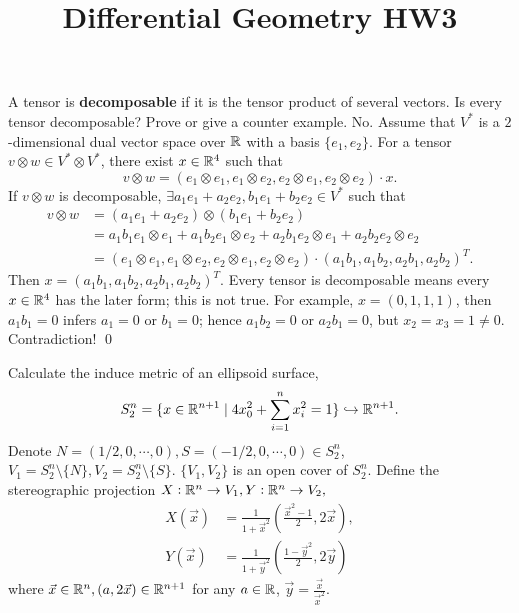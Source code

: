 

\title{Differential Geometry HW3}
\author{\asemail}
\maketitle

\begin{enumerate}
\isep[1em]

\prob A tensor is \textbf{decomposable} if it is the tensor product of several vectors. Is every tensor decomposable? Prove or give a counter example.
\soln
No. Assume that $V^*$ is a $2$-dimensional dual vector space over $\mathbb{R}$ with a basis $\{e_1,e_2\}$. 
For a tensor $v\otimes w\in V^*\otimes V^*$, there exist $x\in \mathbb{R}^4$ such that $$
v\otimes w=(e_1\otimes e_1, e_1\otimes e_2, e_2\otimes e_1, e_2\otimes e_2)\cdot x .$$
If $v\otimes w$ is decomposable, $\exists a_1 e_1+ a_2 e_2, b_1 e_1+ b_2 e_2\in V^*$ such that 
\begin{align*}
	v\otimes w &= (a_1 e_1+ a_2 e_2)\otimes (b_1 e_1+ b_2 e_2) \\
	&= a_1b_1 e_1\otimes e_1+a_1b_2 e_1\otimes e_2+a_2b_1 e_2\otimes e_1+a_2b_2 e_2\otimes e_2 \\
	&= (e_1\otimes e_1, e_1\otimes e_2, e_2\otimes e_1, e_2\otimes e_2)\cdot (a_1b_1, a_1b_2, a_2b_1, a_2b_2)^T.
\end{align*}
Then $x=(a_1b_1, a_1b_2, a_2b_1, a_2b_2)^T$. Every tensor is decomposable means every $x\in \mathbb{R}^4$ has the later form; this is not true. For example, $x=(0,1,1,1)$, then $a_1b_1=0$ infers $a_1=0$ or $b_1=0$; hence $a_1b_2=0$ or $a_2b_1=0$, but $x_2=x_3=1\neq 0$. Contradiction!
\qed

\prob Calculate the induce metric of an ellipsoid surface, $$
S^n_2=\{x\in \mathbb{R}^{n+1}\mid 4x_0^2+\sum_{i=1}^n x_i^2=1 \}\hookrightarrow \mathbb{R}^{n+1}. $$
\soln
Denote $N=(1/2,0,\cdots,0), S=(-1/2,0,\cdots,0)\in S^n_2$, $V_1=S^n_2\setminus \{N\}, V_2=S^n_2\setminus \{S\}$. $\{V_1,V_2\}$ is an open cover of $S^n_2$. Define the stereographic projection $X:\mathbb{R}^n \to V_1, Y:\mathbb{R}^n \to V_2,$ 
\begin{align*}
	X(\vec{x})& =\frac{1}{1+\vec{x}^2}(\frac{\vec{x}^2-1}{2},2\vec{x}), \\
	Y(\vec{x})& =\frac{1}{1+\vec{y}^2}(\frac{1-\vec{y}^2}{2},2\vec{y})
\end{align*}
where $\vec{x}\in \mathbb{R}^n,(a,2\vec{x})\in \mathbb{R}^{n+1}$ for any $a\in \mathbb{R}$, $\vec{y}=\frac{\vec{x}}{\vec{x}^2}$.


\end{enumerate}
